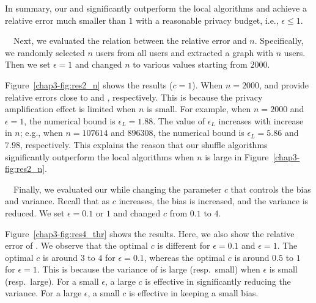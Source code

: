 In summary, our \AlgWSTriVR{} and \AlgWSCyc{} significantly outperform the local algorithms and achieve a relative error much smaller than $1$ with a reasonable privacy budget, i.e., $\epsilon \leq 1$. 

\smallskip
{}~~Next, we evaluated the relation between the relative error and $n$. 
Specifically, we randomly selected $n$ users from all users and extracted a graph with $n$ users. 
Then we set $\epsilon = 1$ and changed $n$ to various values starting from $2000$. 

Figure~\ref{chap3-fig:res2_n} shows the results ($c=1$). 
When $n=2000$, \AlgWSTri{} and \AlgWSCyc{} provide 
relative errors close to \AlgWLTri{} and \AlgWLCyc{}, respectively. 
This is because the privacy amplification effect is limited when $n$ is small. 
For example, when $n=2000$ and $\epsilon=1$, 
the numerical bound is $\epsilon_L=1.88$. 
The value of $\epsilon_L$ increases with increase in $n$; e.g., when $n=107614$ and $896308$, the numerical bound is $\epsilon_L= 5.86$ and $7.98$, respectively. 
This explains the reason that our shuffle algorithms significantly outperform the local algorithms when $n$ is large in Figure~\ref{chap3-fig:res2_n}. 




\smallskip
{}~~Finally, we evaluated our \AlgWSTriVR{} while changing the parameter $c$ that controls the bias and variance. 
Recall that as $c$ increases, the bias is increased, and the variance is reduced. 
We set $\epsilon=0.1$ or $1$ and changed $c$ from $0.1$ to $4$. 

Figure~\ref{chap3-fig:res4_thr} shows the results. 
Here, we also show the relative error of \AlgWSTri{}. 
We observe that the optimal $c$ is different for $\epsilon=0.1$ and $\epsilon=1$. The optimal $c$ is around $3$ to $4$ for $\epsilon=0.1$, whereas the optimal $c$ is around $0.5$ to $1$ for $\epsilon=1$. 
This is because the variance of \AlgWSTri{} is large (resp.~small) when $\epsilon$ is small (resp.~large). 
For a small $\epsilon$, a large $c$ is effective in significantly reducing the variance. 
For a large $\epsilon$, a small $c$ is effective in keeping a small bias. 

